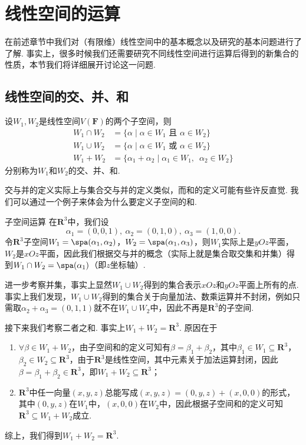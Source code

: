 \chapter{线性空间的运算}

在前述章节中我们对（有限维）线性空间中的基本概念以及研究的基本问题进行了了解. 事实上，很多时候我们还需要研究不同线性空间进行运算后得到的新集合的性质，本节我们将详细展开讨论这一问题.

\section{线性空间的交、并、和}

\begin{definition}{}{}
    设$W_1,W_2$是线性空间$V(\mathbf{F})$的两个子空间，则
    \begin{align*}
        W_1 \cap W_2 & =\{\alpha \mid \alpha\in W_1 \text{~且~} \alpha\in W_2\}            \\
        W_1 \cup W_2 & =\{\alpha \mid \alpha\in W_1 \text{~或~} \alpha\in W_2\}            \\
        W_1 + W_2    & =\{\alpha_1+\alpha_2 \mid \alpha_1\in W_1,\enspace\alpha_2\in W_2\}
    \end{align*}
    分别称为$W_1$和$W_2$的交、并、和.
\end{definition}

交与并的定义实际上与集合交与并的定义类似，而和的定义可能有些许反直觉. 我们可以通过一个例子来体会为什么要定义子空间的和.
\begin{example}{}{子空间运算}
    在$\mathbf{R}^3$中，我们设
    \[\alpha_1=(0,0,1),\ \alpha_2=(0,1,0),\ \alpha_3=(1,0,0).\]
    令$\mathbf{R}^3$子空间$W_1=\spa(\alpha_1,\alpha_2)$，$W_2=\spa(\alpha_1,\alpha_3)$，则$W_1$实际上是$yOz$平面，$W_2$是$xOz$平面，因此我们根据交与并的概念（实际上就是集合取交集和并集）得到$W_1 \cap W_2=\spa(\alpha_1)$（即$z$坐标轴）.

    进一步考察并集，事实上显然$W_1 \cup W_2$得到的集合表示$xOz$和$yOz$平面上所有的点. 事实上我们发现，$W_1 \cup W_2$得到的集合关于向量加法、数乘运算并不封闭，例如只需取$\alpha_2+\alpha_3=(0,1,1)$就不在$W_1 \cup W_2$中，因此不再是$\mathbf{R}^3$的子空间.

    接下来我们考察二者之和. 事实上$W_1+W_2=\mathbf{R}^3$. 原因在于
    \begin{enumerate}
        \item $\forall \beta\in W_1 + W_2$，由子空间和的定义可知有$\beta=\beta_1+\beta_2$，其中$\beta_1\in W_1\subseteq \mathbf{R}^3$，$\beta_2\in W_2\subseteq \mathbf{R}^3$，由于$\mathbf{R}^3$是线性空间，其中元素关于加法运算封闭，因此$\beta=\beta_1+\beta_2\in \mathbf{R}^3$，即$W_1+W_2\subseteq \mathbf{R}^3$；

        \item $\mathbf{R}^3$中任一向量$(x,y,z)$总能写成$(x,y,z)=(0,y,z)+(x,0,0)$的形式，其中$(0,y,z)$在$W_1$中，$(x,0,0)$在$W_2$中，因此根据子空间和的定义可知$\mathbf{R}^3\subseteq W_1 + W_2$成立.
    \end{enumerate}
    综上，我们得到$W_1+W_2=\mathbf{R}^3$.
\end{example}

